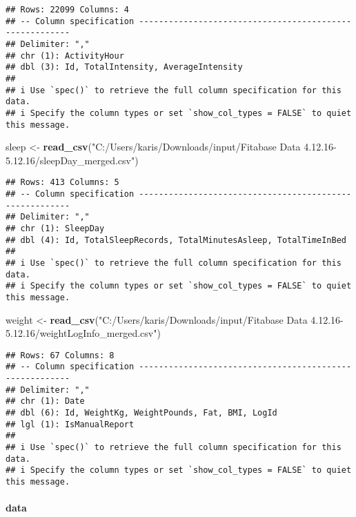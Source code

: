 \documentclass[
]{article}
\newenvironment{Shaded}{\begin{snugshade}}{\end{snugshade}}
\newcommand{\FunctionTok}[1]{\textcolor[rgb]{0.13,0.29,0.53}{\textbf{#1}}}
\newcommand{\NormalTok}[1]{#1}
\newcommand{\OtherTok}[1]{\textcolor[rgb]{0.56,0.35,0.01}{#1}}
\newcommand{\StringTok}[1]{\textcolor[rgb]{0.31,0.60,0.02}{#1}}
\begin{document}
\begin{verbatim}
## Rows: 22099 Columns: 4
## -- Column specification --------------------------------------------------------
## Delimiter: ","
## chr (1): ActivityHour
## dbl (3): Id, TotalIntensity, AverageIntensity
## 
## i Use `spec()` to retrieve the full column specification for this data.
## i Specify the column types or set `show_col_types = FALSE` to quiet this message.
\end{verbatim}

\begin{Shaded}
\begin{Highlighting}[]
\NormalTok{sleep }\OtherTok{\textless{}{-}} \FunctionTok{read\_csv}\NormalTok{(}\StringTok{"C:/Users/karis/Downloads/input/Fitabase Data 4.12.16{-}5.12.16/sleepDay\_merged.csv"}\NormalTok{)}
\end{Highlighting}
\end{Shaded}

\begin{verbatim}
## Rows: 413 Columns: 5
## -- Column specification --------------------------------------------------------
## Delimiter: ","
## chr (1): SleepDay
## dbl (4): Id, TotalSleepRecords, TotalMinutesAsleep, TotalTimeInBed
## 
## i Use `spec()` to retrieve the full column specification for this data.
## i Specify the column types or set `show_col_types = FALSE` to quiet this message.
\end{verbatim}

\begin{Shaded}
\begin{Highlighting}[]
\NormalTok{weight }\OtherTok{\textless{}{-}} \FunctionTok{read\_csv}\NormalTok{(}\StringTok{"C:/Users/karis/Downloads/input/Fitabase Data 4.12.16{-}5.12.16/weightLogInfo\_merged.csv"}\NormalTok{)}
\end{Highlighting}
\end{Shaded}

\begin{verbatim}
## Rows: 67 Columns: 8
## -- Column specification --------------------------------------------------------
## Delimiter: ","
## chr (1): Date
## dbl (6): Id, WeightKg, WeightPounds, Fat, BMI, LogId
## lgl (1): IsManualReport
## 
## i Use `spec()` to retrieve the full column specification for this data.
## i Specify the column types or set `show_col_types = FALSE` to quiet this message.
\end{verbatim}

\hypertarget{data}{%
\paragraph{data}\label{data}}
\end{document}
